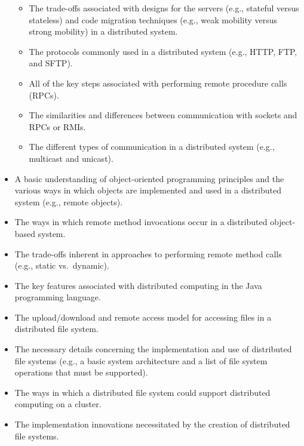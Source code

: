 \begin{itemize}[leftmargin=0.25in]
\begin{itemize}[leftmargin=0in]
      \item The trade-offs associated with designs for the servers (e.g., stateful versus stateless) and code migration
        techniques (e.g., weak mobility versus strong mobility) in a distributed system.

      \item The protocols commonly used in a distributed system (e.g., HTTP, FTP, and SFTP).

      \item All of the key steps associated with performing remote procedure calls (RPCs).

      \item The similarities and differences between communication with sockets and RPCs or RMIs.

      \item The different types of communication in a distributed system (e.g., multicast and unicast).

    \end{itemize}

  \item A basic understanding of object-oriented programming principles and the various ways in which objects are
    implemented and used in a distributed system (e.g., remote objects).

  \item The ways in which remote method invocations occur in a distributed object-based system.

  \item The trade-offs inherent in approaches to performing remote method calls (e.g., static \mbox{vs.\ dynamic}).

  \item The key features associated with distributed computing in the Java programming language.

  \item The upload/download and remote access model for accessing files in a distributed file system.

  \item The necessary details concerning the implementation and use of distributed file systems (e.g., a basic system
    architecture and a list of file system operations that must be supported).

  \item The ways in which a distributed file system could support distributed computing on a cluster.

  \item The implementation innovations necessitated by the creation of distributed file systems.


\end{itemize}
